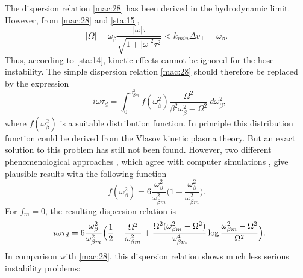 \documentclass [12pt,a4paper,     ]{report} %
\begin{document}
	The dispersion relation \eqref{mac:28} has been derived in the hydrodynamic limit.  However, from \eqref{mac:28} and \eqref{sta:15}, 
%
\begin{equation}\label{mac:33} %
    |\Omega| = \omega_\beta \frac{|\omega|\tau}{\sqrt{1+|\omega|^2\tau^2}}
             < k_{min}\Delta v_{\perp} = \omega_\beta.
\end{equation}
%
Thus, according to \eqref{sta:14}, kinetic effects cannot be ignored for the hose instability.  The simple dispersion relation \eqref{mac:28} should therefore be replaced by the expression
%
\begin{equation}\label{mac:34} %
      -i\omega\tau_d =  \int_{0}^{\omega_{\beta m}^2}
        f(\omega_\beta^2) \frac{\Omega^2}
                               {\beta^2\omega_\beta^2 - \Omega^2}
                          ~d\omega_{\beta}^2,
\end{equation}
%
where $f(\omega_\beta^2)$ is a suitable distribution function.  In principle this distribution function could be derived from the Vlasov kinetic plasma theory.  But an exact solution to this problem has still not been found.  However, two different phenomenological approaches \cite{LEE--1978-,UHM--1980-}, which agree with computer simulations \cite{LAMPE1981-}, give plausible results with the following function
%
\begin{equation}\label{mac:35} %
   f(\omega_\beta^2)  = 6 \frac{\omega_{\beta}^2}{\omega_{\beta m}^2}
                \bigl(1 - \frac{\omega_{\beta}^2}{\omega_{\beta m}^2}\bigr).
\end{equation}
%
For $f_m=0$, the resulting dispersion relation is \cite{LEE--1978-,UHM--1980-}
%
\begin{equation}\label{mac:36} %
  -i\omega\tau_d = 6 \frac{\omega_{\beta}^2}{\omega_{\beta m}^2}
               \Bigl(\frac{1}{2}
                   - \frac{\Omega^2}{\omega_{\beta m}^2}
                   + \frac{\Omega^2(\omega_{\beta m}^2-\Omega^2)}
                          {\omega_{\beta m}^4}
                          \log\frac{\omega_{\beta m}^2-\Omega^2}{\Omega^2}
               \Bigr).
\end{equation}
%
In comparison with \eqref{mac:28}, this dispersion relation shows much less serious instability problems:
\end{document}
